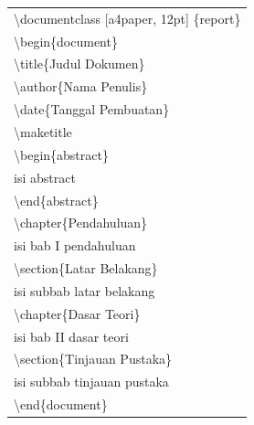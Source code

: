 \begin{tabular}{|p{13.5 cm}|}
\hline
\textbackslash documentclass [a4paper, 12pt] \{report\}\\
\textbackslash begin\{document\}\\
   \textbackslash title\{Judul Dokumen\}\\
    \textbackslash author\{Nama Penulis\}\\
    \textbackslash date\{Tanggal Pembuatan\}\\
    \textbackslash maketitle\\

       \textbackslash begin\{abstract\}\\
          isi abstract\\
       \textbackslash end\{abstract\}\\

        \textbackslash chapter\{Pendahuluan\}\\
           isi bab I pendahuluan\\
         \textbackslash section\{Latar Belakang\}\\
           isi subbab latar belakang\\

          \textbackslash chapter\{Dasar Teori\}\\
              isi bab II dasar teori\\
          \textbackslash section\{Tinjauan Pustaka\}\\
              isi subbab tinjauan pustaka\\

\textbackslash end\{document\}\\
\hline
\end{tabular}
